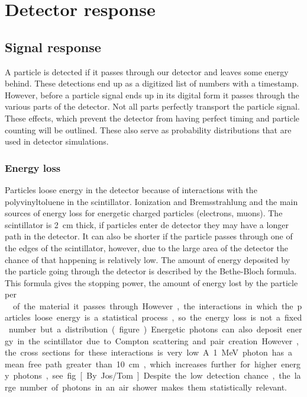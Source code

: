\chapter{Detector response}

\section{Signal response}

A particle is detected if it passes through our detector and leaves some
energy behind. These detections end up as a digitized list of numbers
with a timestamp. However, before a particle signal ends up in its
digital form it passes through the various parts of the detector. Not
all parts perfectly transport the particle signal. These effects, which
prevent the detector from having perfect timing and particle counting
will be outlined. These also serve as probability distributions that are
used in detector simulations.


\subsection{Energy loss}

Particles loose energy in the detector because of interactions with the
polyvinyltoluene in the scintillator. Ionization and Bremsstrahlung and
the main sources of energy loss for energetic charged particles
(electrons, muons). The scintillator is \SI{2}{\centi\meter} thick, if
particles enter de detector they may have a longer path in the detector.
It can also be shorter if the particle passes through one of the edges
of the scintillator, however, due to the large area of the detector the
chance of that happening is relatively low. The amount of energy
deposited by the particle going through the detector is described by the
Bethe-Bloch formula. This formula gives the stopping power, the amount
of energy lost by the particle per \SI{}{\gram\centi\meter\square} of
the material it passes through. However, the interactions in which the
particles loose energy is a statistical process, so the energy loss is
not a fixed number but a distribution. (figure...)

Energetic photons can also deposit energy in the scintillator due to
Compton scattering and pair creation. However, the cross sections for
these interactions is very low. A \SI{1}{\mega\electronvolt} photon  has
a mean free path greater than \SI{10}{\centi\meter}, which increases
further for higher energy photons, see fig [By Jos/Tom]. Despite the low
detection chance, the large number of photons in an air shower makes
them statistically relevant.

